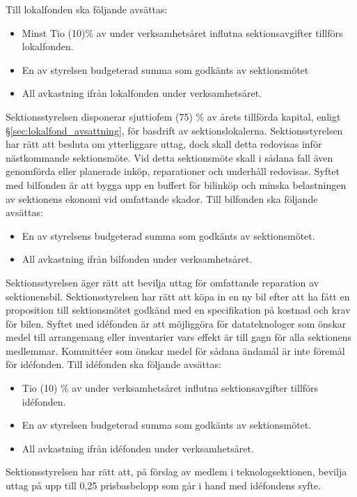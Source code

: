 \documentclass[a4paper]{dteklag}
\begin{document}
\para Till lokalfonden ska följande avsättas:
\begin{itemize}
\item Minst Tio (10)\% av under verksamhetsåret influtna sektionsavgifter tillförs lokalfonden.
\item En av styrelsen budgeterad summa som godkänts av sektionsmötet
\item All avkastning ifrån lokalfonden under verksamhetsåret.
\end{itemize}
\para Sektionsstyrelsen disponerar sjuttiofem (75) \% av årets tillförda kapital, enligt \S\ref{sec:lokalfond_avsattning}, för basdrift av sektionslokalerna.
\para Sektionsstyrelsen har rätt att besluta om ytterliggare uttag, dock skall detta redovisas inför nästkommande sektionsmöte. Vid detta sektionsmöte skall i sådana fall även genomförda eller planerade inköp, reparationer och underhåll redovisas.
\para[Bilfonden] Syftet med bilfonden är att bygga upp en buffert för bilinköp och minska belastningen av sektionens ekonomi vid omfattande skador.
\para Till bilfonden ska följande avsättas:
\begin{itemize}
\item En av styrelsens budgeterad summa som godkänts av sektionsmötet.
\item All avkastning ifrån bilfonden under verksamhetsåret.
\end{itemize}
\para Sektionsstyrelsen äger rätt att bevilja uttag för omfattande reparation av sektionensbil.
\para Sektionsstyrelsen har rätt att köpa in en ny bil efter att ha fått en proposition till sektionsmötet godkänd med en specifikation på kostnad och krav för bilen.
\para[Idéfonden] Syftet med idéfonden är att möjliggöra för datateknologer som önskar medel till arrangemang eller inventarier vars effekt är till gagn för alla sektionens medlemmar.
\stycke Kommittéer som önskar medel för sådana ändamål är inte föremål för idéfonden.
\para Till idéfonden ska följande avsättas:
\begin{itemize}
\item Tio (10) \% av under verksamhetsåret influtna sektionsavgifter tillförs idéfonden.
\item En av styrelsen budgeterad summa som godkänts av sektionsmötet.
\item All avkastning ifrån idéfonden under verksamhetsåret.
\end{itemize}
\para Sektionsstyrelsen har rätt att, på förslag av medlem i teknologsektionen, bevilja uttag på upp till 0,25 prisbasbelopp som går i hand med idéfondens syfte.
\end{document}
